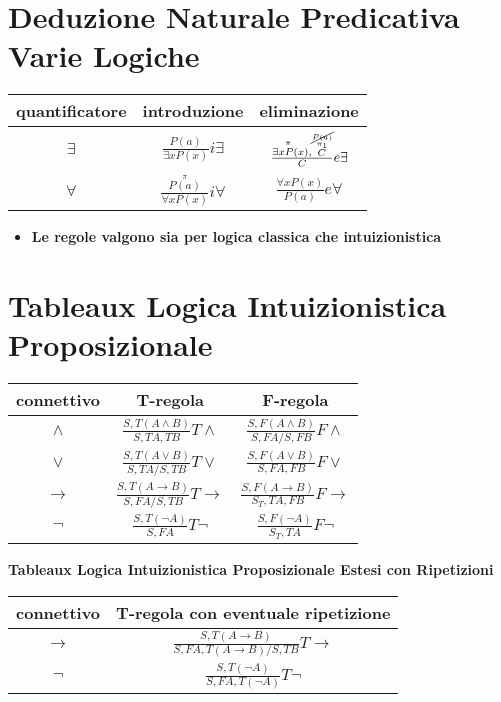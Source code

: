 \documentclass[a4paper,12pt, oneside]{book}
\begin{document}
\section*{Deduzione Naturale Predicativa Varie Logiche}
\begin{table}[H]
  \Large
  \centering
  \begin{tabular}{c|c|c}
    quantificatore & introduzione & eliminazione\\
    \hline
    $\exists$ & $\frac{P(a)}{\exists xP(x)}i\exists$
                                  &$\frac{\stackrel{\pi}{\exists xP(x}),
                                    \stackrel{
                                    \stackrel{\cancel{P(a)}}{\pi_1}}{C}}{C}
                                    e\exists$\\
    \hline
    $\forall$ & $\frac{\stackrel{\pi}{P(a)}}{\forall xP(x)}i\forall$
                                  &$\frac{\forall xP(x)}{P(a)}e\forall$\\
  \end{tabular}
\end{table}
\begin{itemize}
  \item \textbf{Le regole valgono sia per logica classica che intuizionistica}
\end{itemize}
\section*{Tableaux Logica Intuizionistica Proposizionale}
\begin{table}[H]
  \Large
  \centering
  \begin{tabular}{c||c|c}
    connettivo& T-regola& F-regola\\
    \hline
    \hline
    $\land$ & $\frac{S,T(A\land B)}{S,TA,TB}T\land$&
                        $\frac{S,F(A\land B)}{S,FA/S,FB}F\land$\\
    \hline
    $\lor$ & $\frac{S,T(A\lor B)}{S,TA/S,TB}T\lor$&
                        $\frac{S,F(A\lor B)}{S,FA,FB}F\lor$\\
    \hline
    $\to$ & $\frac{S,T(A\to B)}{S,FA/S,TB}T\to$&
                        $\frac{S,F(A\to B)}{S_T,TA,FB}F\to$\\
    \hline
    $\neg$ & $\frac{S,T(\neg A)}{S,FA}T\neg$&
                        $\frac{S,F(\neg A)}{S_T,TA}F\neg$\\
    \hline
  \end{tabular}
\end{table}
\begin{center}
  \textbf{Tableaux Logica Intuizionistica Proposizionale Estesi con Ripetizioni}
\end{center}
\begin{table}[H]
  \Large
  \centering
  \begin{tabular}{c||c}
    connettivo& T-regola con eventuale ripetizione\\
    \hline
    \hline
    $\to$ & $\frac{S,T(A\to B)}{S,FA,T(A\to B)/S,TB}T\to$\\
    \hline
    $\neg$ & $\frac{S,T(\neg A)}{S,FA,T(\neg A)}T\neg$
  \end{tabular}
\end{table}
\end{document}
